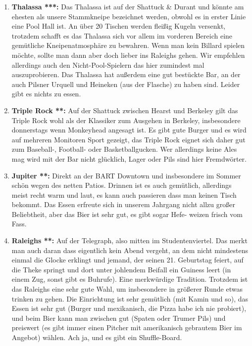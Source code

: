 \documentclass[a4paper]{scrreprt}
\begin{document}
\begin{enumerate}

  \item \textbf{Thalassa ***:} Das Thalassa ist auf der Shattuck \& Durant und könnte am ehesten als unsere Stammkneipe bezeichnet werden, obwohl es in erster Linie eine Pool Hall ist. An über 20 Tischen werden fleißig Kugeln versenkt, trotzdem schafft es das Thalassa sich vor allem im vorderen Bereich eine gemütliche Kneipenatmosphäre zu bewahren. Wenn man kein Billard spielen möchte, sollte man dann aber doch lieber ins Raleighs gehen. Wir empfehlen allerdings auch den Nicht-Pool-Spielern das hier zumindest mal auszuprobieren. Das Thalassa hat außerdem eine gut bestückte Bar, an der auch Pilsner Urquell und Heineken (aus der Flasche) zu haben sind. Leider gibt es nichts zu essen.

  \item \textbf{Triple Rock **:} Auf der Shattuck zwischen Hearst und Berkeley gilt das Triple Rock wohl als der Klassiker zum Ausgehen in Berkeley, insbesondere donnerstags wenn Monkeyhead angesagt ist. Es gibt gute Burger und es wird auf mehreren Monitoren Sport gezeigt, das Triple Rock eignet sich daher gut zum Baseball-, Football- oder Basketballgucken. Wer allerdings keine Ales mag wird mit der Bar nicht glücklich, Lager oder Pils sind hier Fremdwörter.
  
  \item \textbf{Jupiter **:} Direkt an der BART Downtown und insbesondere im Sommer schön wegen des netten Patios. Drinnen ist es auch gemütlich, allerdings meist recht warm und laut, es kann auch passieren dass man keinen Tisch bekommt. Das Essen erfreute sich in unserem Jahrgang nicht allzu großer Beliebtheit, aber das Bier ist sehr gut, es gibt sogar Hefe- weizen frisch vom Fass.
  
  \item \textbf{Raleighs **:} Auf der Telegraph, also mitten im Studentenviertel. Das merkt man auch daran dass eigentlich kein Abend vergeht, an dem nicht mindestens einmal die Glocke erklingt und jemand, der seinen 21. Geburtstag feiert, auf die Theke springt und dort unter johlendem Beifall ein Guiness leert (in einem Zug, sonst gibt es Buhrufe). Eine merkwürdige Tradition. Trotzdem ist das Raleighs eine sehr gute Wahl, um insbesondere in größerer Runde etwas trinken zu gehen. Die Einrichtung ist sehr gemütlich (mit Kamin und so), das Essen ist sehr gut (Burger und mexikanisch, die Pizza habe ich nie probiert), und beim Bier kann man zwischen gut (Spaten oder Trumer Pils) und preiswert (es gibt immer einen Pitcher mit amerikanisch gebrautem Bier im Angebot) wählen. Ach ja, und es gibt ein Shuffle-Board.
  

\end{enumerate}
\end{document}
